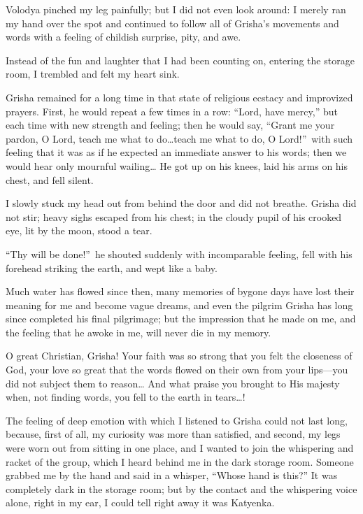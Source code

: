 Volodya pinched my leg painfully; but I did not even look around: I merely ran my hand over the spot and continued to follow all of Grisha's movements and words with a feeling of childish surprise, pity, and awe.

Instead of the fun and laughter that I had been counting on, entering the storage room, I trembled and felt my heart sink.

Grisha remained for a long time in that state of religious ecstacy and improvized prayers. First, he would repeat a few times in a row: ``Lord, have mercy,'' but each time with new strength and feeling; then he would say, ``Grant me your pardon, O Lord, teach me what to do\ldots{}teach me what to do, O Lord!''~with such feeling that it was as if he expected an immediate answer to his words; then we would hear only mournful wailing\ldots{} He got up on his knees, laid his arms on his chest, and fell silent. %

I slowly stuck my head out from behind the door and did not breathe. Grisha did not stir; heavy sighs escaped from his chest; in the cloudy pupil of his crooked eye, lit by the moon, stood a tear. 

``Thy will be done!''~he shouted suddenly with incomparable feeling, fell with his forehead striking the earth, and wept like a baby. %

Much water has flowed since then, many memories of bygone days have lost their meaning for me and become vague dreams, and even the pilgrim Grisha has long since completed his final pilgrimage; but the impression that he made on me, and the feeling that he awoke in me, will never die in my memory.

O great Christian, Grisha! Your faith was so strong that you felt the closeness of God, your love so great that the words flowed on their own from your lips---you did not subject them to reason\ldots{} And what praise you brought to His majesty when, not finding words, you fell to the earth in tears\ldots{}!

The feeling of deep emotion with which I listened to Grisha could not last long, because, first of all, my curiosity was more than satisfied, and second, my legs were worn out from sitting in one place, and I wanted to join the whispering and racket of the group, which I heard behind me in the dark storage room. Someone grabbed me by the hand and said in a whisper, ``Whose hand is this?'' It was completely dark in the storage room; but by the contact and the whispering voice alone, right in my ear, I could tell right away it was Katyenka.

